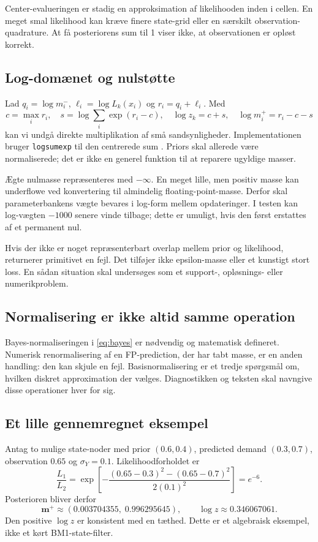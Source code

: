 Center-evalueringen er stadig en approksimation af likelihooden inden i cellen. En meget smal likelihood kan kræve finere state-grid eller en særskilt observation-quadrature. At få posteriorens sum til 1 viser ikke, at observationen er opløst korrekt.

\subsection{Log-domænet og nulstøtte}
Lad \(q_i=\log m_i^-\), \(\ell_i=\log L_k(x_i)\) og \(r_i=q_i+\ell_i\). Med
\begin{equation}
 c=\max_i r_i,\quad s=\log\sum_i\exp(r_i-c),\quad
 \log z_k=c+s,\quad \log m_i^+=r_i-c-s
 \label{eq:logbayes}
\end{equation}
kan vi undgå direkte multiplikation af små sandsynligheder. Implementationen bruger \texttt{logsumexp} til den centrerede sum \cite{scipylog}. Priors skal allerede være normaliserede; det er ikke en generel funktion til at reparere ugyldige masser.

Ægte nulmasse repræsenteres med \(-\infty\). En meget lille, men positiv masse kan underflowe ved konvertering til almindelig floating-point-masse. Derfor skal parameterbankens vægte bevares i log-form mellem opdateringer. I testen kan log-vægten \(-1000\) senere vinde tilbage; dette er umuligt, hvis den først erstattes af et permanent nul.

Hvis der ikke er noget repræsenterbart overlap mellem prior og likelihood, returnerer primitivet en fejl. Det tilføjer ikke epsilon-masse eller et kunstigt stort loss. En sådan situation skal undersøges som et support-, opløsnings- eller numerikproblem.

\subsection{Normalisering er ikke altid samme operation}
Bayes-normaliseringen i \eqref{eq:bayes} er nødvendig og matematisk defineret. Numerisk renormalisering af en FP-prediction, der har tabt masse, er en anden handling: den kan skjule en fejl. Basisnormalisering er et tredje spørgsmål om, hvilken diskret approximation der vælges. Diagnostikken og teksten skal navngive disse operationer hver for sig.

\subsection{Et lille gennemregnet eksempel}
Antag to mulige state-noder med prior \((0.6,0.4)\), predicted demand \((0.3,0.7)\), observation \(0.65\) og \(\sigma_Y=0.1\). Likelihoodforholdet er
\[
 \frac{L_1}{L_2}=\exp\!\left[-\frac{(0.65-0.3)^2-(0.65-0.7)^2}{2(0.1)^2}\right]=e^{-6}.
\]
Posterioren bliver derfor
\begin{equation}
 \bm m^+\approx(0.003704355,\;0.996295645),\qquad \log z\approx0.346067061.
 \label{eq:toybayes}
\end{equation}
Den positive \(\log z\) er konsistent med en tæthed. Dette er et algebraisk eksempel, ikke et kørt BM1-state-filter.

